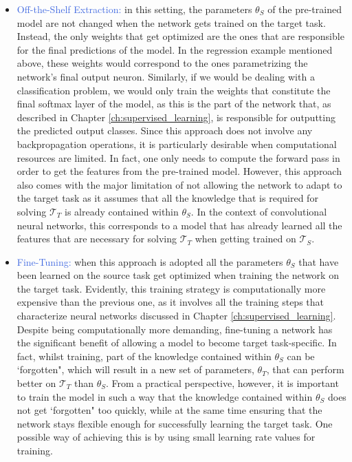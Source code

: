 \begin{itemize}
	\item \textcolor{RoyalBlue}{Off-the-Shelf Extraction:} in this setting, the parameters $\theta_S$ of the pre-trained model are not changed when the network gets trained on the target task. Instead, the only weights that get optimized are the ones that are responsible for the final predictions of the model. In the regression example mentioned above, these weights would correspond to the ones parametrizing the network's final output neuron. Similarly, if we would be dealing with a classification problem, we would only train the weights that constitute the final softmax layer of the model, as this is the part of the network that, as described in Chapter \ref{ch:supervised_learning}, is responsible for outputting the predicted output classes. Since this approach does not involve any backpropagation operations, it is particularly desirable when computational resources are limited. In fact, one only needs to compute the forward pass in order to get the features from the pre-trained model. However, this approach also comes with the major limitation of not allowing the network to adapt to the target task as it assumes that all the knowledge that is required for solving $\mathcal{T}_T$ is already contained within $\theta_S$. In the context of convolutional neural networks, this corresponds to a model that has already learned all the features that are necessary for solving $\mathcal{T}_T$ when getting trained on $\mathcal{T}_S$.   

	\item \textcolor{RoyalBlue}{Fine-Tuning:} when this approach is adopted all the parameters $\theta_S$ that have been learned on the source task get optimized when training the network on the target task. Evidently, this training strategy is computationally more expensive than the previous one, as it involves all the training steps that characterize neural networks discussed in Chapter \ref{ch:supervised_learning}. Despite being computationally more demanding, fine-tuning a network has the significant benefit of allowing a model to become target task-specific. In fact, whilst training, part of the knowledge contained within $\theta_S$ can be `forgotten", which will result in a new set of parameters, $\theta_T$, that can perform better on $\mathcal{T}_T$ than $\theta_S$. From a practical perspective, however, it is important to train the model in such a way that the knowledge contained within $\theta_S$ does not get `forgotten" too quickly, while at the same time ensuring that the network stays flexible enough for successfully learning the target task. One possible way of achieving this is by using small learning rate values for training.      


\end{itemize}

